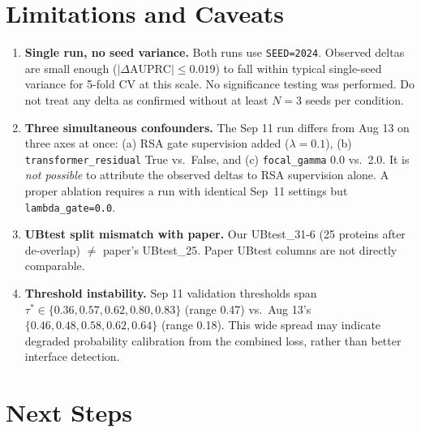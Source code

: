 \documentclass[10pt, a4paper]{article}
\newcommand{\code}[1]{\texttt{\small #1}}
\begin{document}
\section{Limitations and Caveats}

\begin{tcolorbox}[colback=warnbg, colframe=warnorange, title=\textbf{Critical Caveats}]
\begin{enumerate}[leftmargin=*]
    \item \textbf{Single run, no seed variance.}
          Both runs use \code{SEED=2024}.  Observed deltas are small enough
          ($|\Delta\text{AUPRC}| \le 0.019$) to fall within typical single-seed
          variance for 5-fold CV at this scale.  No significance testing was
          performed.  Do not treat any delta as confirmed without at least
          $N=3$ seeds per condition.

    \item \textbf{Three simultaneous confounders.}
          The Sep 11 run differs from Aug 13 on three axes at once:
          (a) RSA gate supervision added ($\lambda=0.1$),
          (b) \code{transformer\_residual} True vs.\ False, and
          (c) \code{focal\_gamma} 0.0 vs.\ 2.0.
          It is \emph{not possible} to attribute the observed deltas to RSA
          supervision alone.  A proper ablation requires a run with identical Sep~11
          settings but \code{lambda\_gate=0.0}.

    \item \textbf{UBtest split mismatch with paper.}
          Our UBtest\_31-6 (25 proteins after de-overlap) $\ne$ paper's
          UBtest\_25.  Paper UBtest columns are not directly comparable.

    \item \textbf{Threshold instability.}
          Sep 11 validation thresholds span $\tau^* \in \{0.36, 0.57, 0.62,
          0.80, 0.83\}$ (range 0.47) vs.\ Aug 13's $\{0.46, 0.48, 0.58,
          0.62, 0.64\}$ (range 0.18).  This wide spread may indicate degraded
          probability calibration from the combined loss, rather than better
          interface detection.
\end{enumerate}
\end{tcolorbox}

\section{Next Steps}
\end{document}
